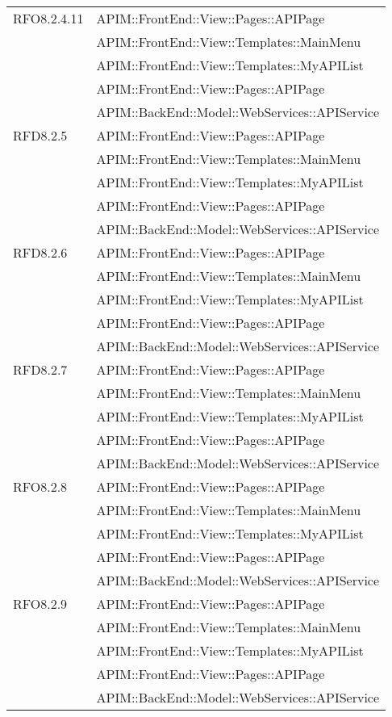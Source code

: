 \begin{longtable}{ p{4cm} | p{12cm} }
\hline RFO8.2.4.11
& APIM::FrontEnd::View::Pages::APIPage \\
& APIM::FrontEnd::View::Templates::MainMenu \\
& APIM::FrontEnd::View::Templates::MyAPIList \\
& APIM::FrontEnd::View::Pages::APIPage \\
& APIM::BackEnd::Model::WebServices::APIService \\

\hline RFD8.2.5
& APIM::FrontEnd::View::Pages::APIPage \\
& APIM::FrontEnd::View::Templates::MainMenu \\
& APIM::FrontEnd::View::Templates::MyAPIList \\
& APIM::FrontEnd::View::Pages::APIPage \\
& APIM::BackEnd::Model::WebServices::APIService \\

\hline RFD8.2.6
& APIM::FrontEnd::View::Pages::APIPage \\
& APIM::FrontEnd::View::Templates::MainMenu \\
& APIM::FrontEnd::View::Templates::MyAPIList \\
& APIM::FrontEnd::View::Pages::APIPage \\
& APIM::BackEnd::Model::WebServices::APIService \\

\hline RFD8.2.7
& APIM::FrontEnd::View::Pages::APIPage \\
& APIM::FrontEnd::View::Templates::MainMenu \\
& APIM::FrontEnd::View::Templates::MyAPIList \\
& APIM::FrontEnd::View::Pages::APIPage \\
& APIM::BackEnd::Model::WebServices::APIService \\

\hline RFO8.2.8
& APIM::FrontEnd::View::Pages::APIPage \\
& APIM::FrontEnd::View::Templates::MainMenu \\
& APIM::FrontEnd::View::Templates::MyAPIList \\
& APIM::FrontEnd::View::Pages::APIPage \\
& APIM::BackEnd::Model::WebServices::APIService \\

\hline RFO8.2.9
& APIM::FrontEnd::View::Pages::APIPage \\
& APIM::FrontEnd::View::Templates::MainMenu \\
& APIM::FrontEnd::View::Templates::MyAPIList \\
& APIM::FrontEnd::View::Pages::APIPage \\
& APIM::BackEnd::Model::WebServices::APIService \\


\end{longtable}
